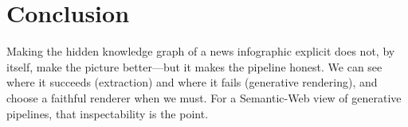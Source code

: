 \documentclass[sigconf,natbib=false, language=english]{acmart}
\begin{document}
\section{Conclusion}
Making the hidden knowledge graph of a news infographic explicit does not, by itself, make the picture better---but it makes the pipeline honest. We can see where it succeeds (extraction) and where it fails (generative rendering), and choose a faithful renderer when we must. For a Semantic-Web view of generative pipelines, that inspectability is the point.

\printbibliography
\end{document}
